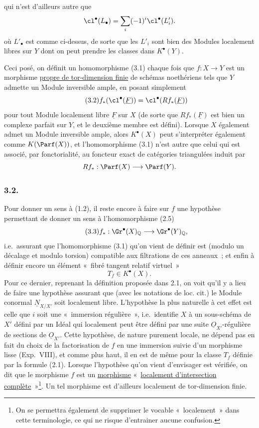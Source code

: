 qui n'est d'ailleurs autre que
\[
\cl^\bullet(L_\bullet)=\sum_i(-1)^i\cl^\bullet(L'_i).
\]
où $L'_\bullet$ est comme ci-dessus, de sorte que les $L'_i$ sont bien des Modules localement libres sur $Y$ dont on peut prendre les classes dans $K^\bullet(Y)$.

Ceci posé, on définit un homomorphisme (3.1) chaque fois que $f:X\to Y$ est un morphisme \underline{propre de tor-dimension finie} de schémas noethériens tels que $Y$ admette un Module inversible ample, en posant simplement
\begin{equation}\tag{3.2}
f_*(\cl^\bullet(\underline F))=\cl^\bullet(Rf_*(\underline F))
\end{equation}
pour tout Module localement libre $\underline F$ sur $X$ (de sorte que $Rf_*(\underline F)$ est bien un complexe parfait sur $Y$, et le deuxième membre est défini). Lorsque $X$ également admet un Module inversible ample, alors $K^\bullet(X)$ peut s'interpréter également comme $K(\Parf(X))$, et l'homomorphisme (3.1) n'est autre que celui qui est associé, par fonctorialité, au foncteur exact de catégories triangulées induit par
\[
Rf_*:\Parf(X)\longrightarrow \Parf(Y).
\]

\subsubsection*{3.2.}
Pour donner un sens à (1.2), il reste encore à faire sur $f$ une hypothèse permettant de donner un sens à l'homomorphisme (2.5)
\begin{equation}\tag{3.3}
f_*:\Gr^\bullet(X)_{\mathbb Q}\longrightarrow \Gr^\bullet(Y)_{\mathbb Q},
\end{equation}
i.e.\ assurant que l'homomorphisme (3.1) qu'on vient de définir est (modulo un décalage et modulo torsion) compatible aux filtrations de ces anneaux~; et enfin à définir encore un élément «~fibré tangent relatif virtuel~»
\[
T_f\in K^\bullet(X).
\]
Pour ce dernier, reprenant la définition proposée dans 2.1, on voit qu'il y a lieu de faire une hypothèse assurant que (avec les notations de loc. cit.) le Module conormal $\underline N_{X/X'}$ soit localement libre. L'hypothèse la plus naturelle à cet effet est celle que $i$ soit une «~immersion régulière~», i.e.\ identifie $X$ à un sous-schéma de $X'$ défini par un Idéal qui localement peut être défini par une suite $\underline O_{X'}$-régulière de sections de $\underline O_{X'}$. Cette hypothèse, de nature purement locale, ne dépend pas en fait du choix de la factorisation de $f$ en une immersion suivie d'un morphisme lisse (Exp.\ VIII), et comme plus haut, il en est de même pour la classe $T_f$ définie par la formule (2.1). Lorsque l'hypothèse qu'on vient d'envisager est vérifiée, on dit que le morphisme $f$ est un \underline{morphisme} «~\underline{localement d'intersection complète}~»\footnote{On se permettra également de supprimer le vocable «~localement~» dans cette terminologie, ce qui ne risque d'entrainer aucune confusion.}. Un tel morphisme est d'ailleurs localement de tor-dimension finie.

